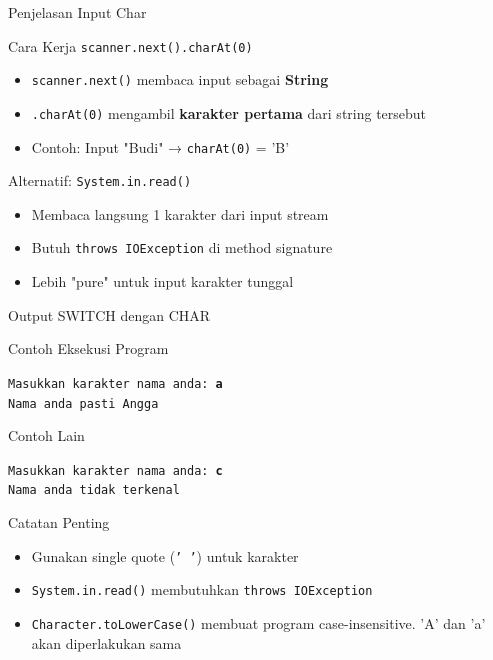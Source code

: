 \documentclass{beamer}
\begin{document}
\begin{frame}{Penjelasan Input Char}
  \begin{block}{Cara Kerja \texttt{scanner.next().charAt(0)}}
    \begin{itemize}
      \item \texttt{scanner.next()} membaca input sebagai \textbf{String}
      \item \texttt{.charAt(0)} mengambil \textbf{karakter pertama} dari string tersebut
      \item Contoh: Input "Budi" → \texttt{charAt(0)} = 'B'
    \end{itemize}
  \end{block}
  
  \begin{alertblock}{Alternatif: \texttt{System.in.read()}}
    \begin{itemize}
      \item Membaca langsung 1 karakter dari input stream
      \item Butuh \texttt{throws IOException} di method signature
      \item Lebih "pure" untuk input karakter tunggal
    \end{itemize}
  \end{alertblock}
\end{frame}

\begin{frame}{Output SWITCH dengan CHAR}
\begin{block}{Contoh Eksekusi Program}
\colorbox{gray!20}{
    \parbox{0.9\textwidth}{
        \texttt{Masukkan karakter nama anda: \textbf{a}\\
        Nama anda pasti Angga}
    }
}
\end{block}

\begin{block}{Contoh Lain}
\colorbox{gray!20}{
    \parbox{0.9\textwidth}{
        \texttt{Masukkan karakter nama anda: \textbf{c}\\
        Nama anda tidak terkenal}
    }
}
\end{block}

\begin{block}{Catatan Penting}
\begin{itemize}
\item Gunakan single quote (\texttt{' '}) untuk karakter
\item \texttt{System.in.read()} membutuhkan \texttt{throws IOException}
\item \texttt{Character.toLowerCase()} membuat program case-insensitive. 'A' dan 'a' akan diperlakukan sama
\end{itemize}
\end{block}
\end{frame}
\end{document}
